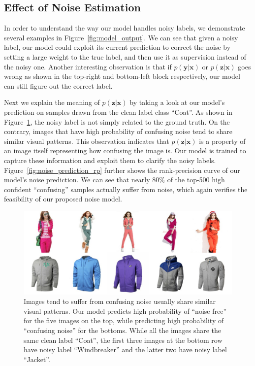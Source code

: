 \documentclass[10pt,twocolumn,letterpaper]{article}
\def\vec{\mathbf}
\begin{document}
\subsection{Effect of Noise Estimation} %
\label{sub:effect_of_noise_estimation}
In order to understand the way our model handles noisy labels, we demonstrate several examples in Figure~\ref{fig:model_output}. We can see that given a noisy label, our model could exploit its current prediction to correct the noise by setting a large weight to the true label, and then use it as supervision instead of the noisy one. Another interesting observation is that if $p(\vec{y}|\vec{x})$ or $p(\vec{z}|\vec{x})$ goes wrong as shown in the top-right and bottom-left block respectively, our model can still figure out the correct label.

Next we explain the meaning of $p(\vec{z}|\vec{x})$ by taking a look at our model's prediction on samples drawn from the clean label class ``Coat''. As shown in Figure~\ref{fig:noise_cluster}, the noisy label is not simply related to the ground truth. On the contrary, images that have high probability of confusing noise tend to share similar visual patterns. This observation indicates that $p(\vec{z}|\vec{x})$ is a property of an image itself representing how confusing the image is. Our model is trained to capture these information and exploit them to clarify the noisy labels. Figure~\ref{fig:noise_prediction_rp} further shows the rank-precision curve of our model's noise prediction. We can see that nearly $80\%$ of the top-500 high confident ``confusing'' samples actually suffer from noise, which again verifies the feasibility of our proposed noise model.

\begin{figure}[t]
\begin{center}
\includegraphics[width=1.0\linewidth]{figure/noise_cluster.pdf}
\end{center}
\caption{Images tend to suffer from confusing noise usually share similar visual patterns. Our model predicts high probability of ``noise free'' for the five images on the top, while predicting high probability of ``confusing noise'' for the bottoms. While all the images share the same clean label ``Coat'', the first three images at the bottom row have noisy label ``Windbreaker'' and the latter two have noisy label ``Jacket''.}
\label{fig:noise_cluster}
\end{figure}
\end{document}
